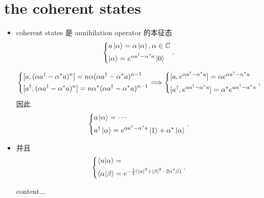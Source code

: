 \documentclass[10pt, a4paper]{article}
\numberwithin{equation}{section}
\begin{document}
	\section{the coherent states}
	\begin{itemize}
		\item coherent states 是 annihilation operator 的本征态
		\begin{equation}
			\begin{dcases}
				a \ket{\alpha} = \alpha \ket{\alpha}, \alpha \in \mathbb{C} \\
				\ket{\alpha} = e^{\alpha a^\dag - \alpha^* a} \ket{0}
			\end{dcases}.
		\end{equation}
		
		\begin{tcolorbox}[title=proof:]
			\begin{equation}
				\begin{dcases}
					[a, (\alpha a^\dag - \alpha^* a)^n] = n \alpha (\alpha a^\dag - \alpha^* a)^{n - 1} \\
					[a^\dag, (\alpha a^\dag - \alpha^* a)^n] = n \alpha^* (\alpha a^\dag - \alpha^* a)^{n - 1}
				\end{dcases} \Longrightarrow \begin{dcases}
					[a, e^{\alpha a^\dag - \alpha^* a}] = \alpha e^{\alpha a^\dag - \alpha^* a} \\
					[a^\dag, e^{\alpha a^\dag - \alpha^* a}] = \alpha^* e^{\alpha a^\dag - \alpha^* a}
				\end{dcases},
			\end{equation}
			因此
			\begin{equation}
				\begin{dcases}
					a \ket{\alpha} = \cdots \\
					a^\dag \ket{\alpha} = e^{\alpha a^\dag - \alpha^* a} \ket{1} + \alpha^* \ket{\alpha}
				\end{dcases}.
			\end{equation}
		\end{tcolorbox}
		
		\item 并且
		\begin{equation}
			\begin{dcases}
				\braket{n | \alpha} = \\
				\braket{\alpha | \beta} = e^{- \frac{1}{2} (|\alpha|^2 + |\beta|^2 - 2 \alpha^* \beta)}
			\end{dcases}.
		\end{equation}
		
		\begin{tcolorbox}[title=calculation:]
			content...
		\end{tcolorbox}
	\end{itemize}
\end{document}
